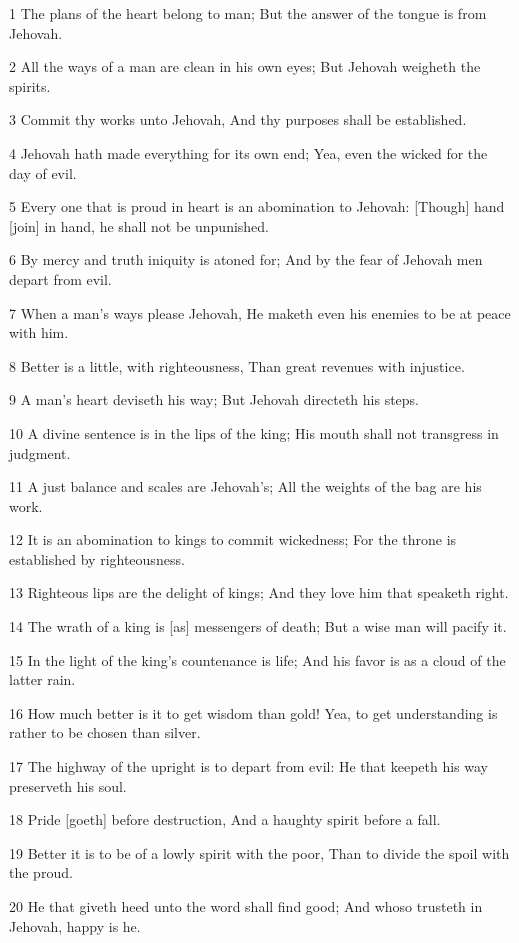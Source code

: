 \par 1 The plans of the heart belong to man; But the answer of the tongue is from Jehovah.
\par 2 All the ways of a man are clean in his own eyes; But Jehovah weigheth the spirits.
\par 3 Commit thy works unto Jehovah, And thy purposes shall be established.
\par 4 Jehovah hath made everything for its own end; Yea, even the wicked for the day of evil.
\par 5 Every one that is proud in heart is an abomination to Jehovah: [Though] hand [join] in hand, he shall not be unpunished.
\par 6 By mercy and truth iniquity is atoned for; And by the fear of Jehovah men depart from evil.
\par 7 When a man's ways please Jehovah, He maketh even his enemies to be at peace with him.
\par 8 Better is a little, with righteousness, Than great revenues with injustice.
\par 9 A man's heart deviseth his way; But Jehovah directeth his steps.
\par 10 A divine sentence is in the lips of the king; His mouth shall not transgress in judgment.
\par 11 A just balance and scales are Jehovah's; All the weights of the bag are his work.
\par 12 It is an abomination to kings to commit wickedness; For the throne is established by righteousness.
\par 13 Righteous lips are the delight of kings; And they love him that speaketh right.
\par 14 The wrath of a king is [as] messengers of death; But a wise man will pacify it.
\par 15 In the light of the king's countenance is life; And his favor is as a cloud of the latter rain.
\par 16 How much better is it to get wisdom than gold! Yea, to get understanding is rather to be chosen than silver.
\par 17 The highway of the upright is to depart from evil: He that keepeth his way preserveth his soul.
\par 18 Pride [goeth] before destruction, And a haughty spirit before a fall.
\par 19 Better it is to be of a lowly spirit with the poor, Than to divide the spoil with the proud.
\par 20 He that giveth heed unto the word shall find good; And whoso trusteth in Jehovah, happy is he.
